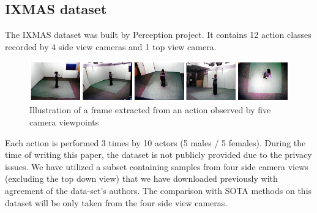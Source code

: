 
\subsection{IXMAS dataset}
    The IXMAS dataset was built by Perception project. It contains 12 action classes recorded by 4 side view cameras and 1 top view camera. 
    \begin{figure}[h]
        \centering
        \includegraphics[width=1\linewidth]{figs/IXMAS1.png}
        \caption{Illustration of a frame extracted from an action observed by five camera viewpoints \cite{weinland2006free}}
        \label{Fig:IXMAS1}
    \end{figure}
    Each action is performed 3 times by 10 actors (5 males / 5 females). %
    During the time of writing this paper, the dataset is not publicly provided due to the privacy issues. We have utilized a subset containing samples from four side camera views (excluding the top down view) that we have downloaded previously with agreement of the data-set's authors. The comparison with SOTA methods on this dataset will be only taken from the four side view cameras. 
